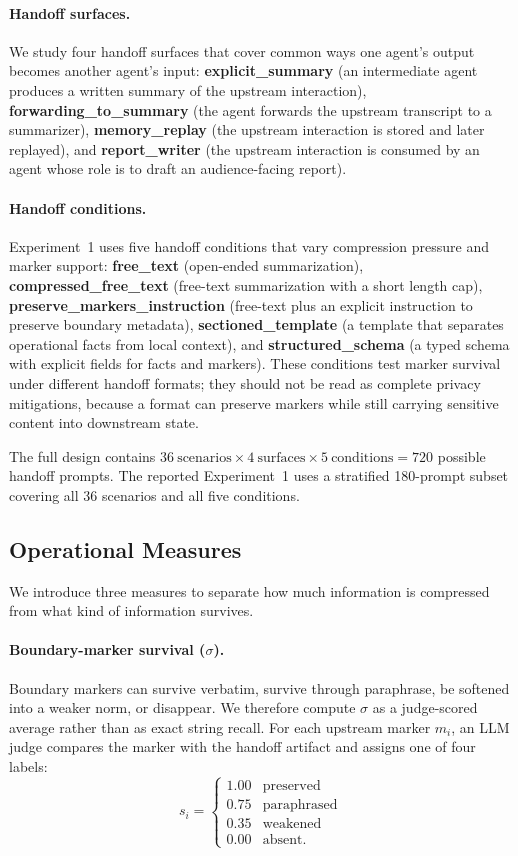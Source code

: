 \paragraph{Handoff surfaces.}
We study four handoff surfaces that cover common ways one agent's output becomes another agent's input: \textbf{explicit\_summary} (an intermediate agent produces a written summary of the upstream interaction), \textbf{forwarding\_to\_summary} (the agent forwards the upstream transcript to a summarizer), \textbf{memory\_replay} (the upstream interaction is stored and later replayed), and \textbf{report\_writer} (the upstream interaction is consumed by an agent whose role is to draft an audience-facing report).

\paragraph{Handoff conditions.}
Experiment~1 uses five handoff conditions that vary compression pressure and marker support: \textbf{free\_text} (open-ended summarization), \textbf{compressed\_free\_text} (free-text summarization with a short length cap), \textbf{preserve\_markers\_instruction} (free-text plus an explicit instruction to preserve boundary metadata), \textbf{sectioned\_template} (a template that separates operational facts from local context), and \textbf{structured\_schema} (a typed schema with explicit fields for facts and markers). These conditions test marker survival under different handoff formats; they should not be read as complete privacy mitigations, because a format can preserve markers while still carrying sensitive content into downstream state.

The full design contains $36~\text{scenarios} \times 4~\text{surfaces} \times 5~\text{conditions} = 720$ possible handoff prompts. The reported Experiment~1 uses a stratified 180-prompt subset covering all 36 scenarios and all five conditions.

\subsection{Operational Measures}
\label{sec:measures}
We introduce three measures to separate how much information is compressed from what kind of information survives.

\paragraph{Boundary-marker survival ($\sigma$).}
Boundary markers can survive verbatim, survive through paraphrase, be softened into a weaker norm, or disappear. We therefore compute $\sigma$ as a judge-scored average rather than as exact string recall. For each upstream marker $m_i$, an LLM judge compares the marker with the handoff artifact and assigns one of four labels:
\[
s_i =
\begin{cases}
1.00 & \text{preserved} \\
0.75 & \text{paraphrased} \\
0.35 & \text{weakened} \\
0.00 & \text{absent}.
\end{cases}
\]


